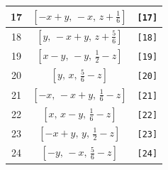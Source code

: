 \documentclass[fleqn,8pt]{jsarticle}
\begin{document}
\begin{longtable}{ccc}
17 & $\left[ - x + y,\, - x,\, z + \frac{1}{6} \right]$ & {\tt [17]} \\ \hline
18 & $\left[ y,\, - x + y,\, z + \frac{5}{6} \right]$ & {\tt [18]} \\ \hline
19 & $\left[ x - y,\, - y,\, \frac{1}{2} - z \right]$ & {\tt [19]} \\ \hline
20 & $\left[ y,\, x,\, \frac{5}{6} - z \right]$ & {\tt [20]} \\ \hline
21 & $\left[ - x,\, - x + y,\, \frac{1}{6} - z \right]$ & {\tt [21]} \\ \hline
22 & $\left[ x,\, x - y,\, \frac{1}{6} - z \right]$ & {\tt [22]} \\ \hline
23 & $\left[ - x + y,\, y,\, \frac{1}{2} - z \right]$ & {\tt [23]} \\ \hline
24 & $\left[ - y,\, - x,\, \frac{5}{6} - z \right]$ & {\tt [24]} \\
\end{longtable}
\end{document}
